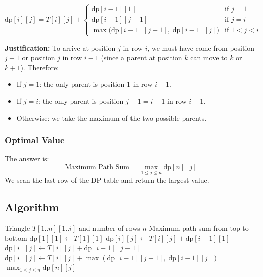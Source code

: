 \documentclass[12pt,a4paper]{article}
\begin{document}
\[
    \text{dp}[i][j] = T[i][j] + \begin{cases}
        \text{dp}[i-1][1] & \text{if } j = 1 \\[6pt]
        \text{dp}[i-1][j-1] & \text{if } j = i \\[6pt]
        \max\!\big(\text{dp}[i-1][j-1],\; \text{dp}[i-1][j]\big) & \text{if } 1 < j < i
    \end{cases}
\]

\textbf{Justification:} To arrive at position $j$ in row $i$, we must have come from position $j-1$ or position $j$ in row $i-1$ (since a parent at position $k$ can move to $k$ or $k+1$). Therefore:
\begin{itemize}[nosep]
    \item If $j = 1$: the only parent is position $1$ in row $i-1$.
    \item If $j = i$: the only parent is position $j-1 = i-1$ in row $i-1$.
    \item Otherwise: we take the maximum of the two possible parents.
\end{itemize}

\subsubsection*{Optimal Value}
The answer is:
\[
    \text{Maximum Path Sum} = \max_{1 \le j \le n} \text{dp}[n][j]
\]
We scan the last row of the DP table and return the largest value.

\subsection*{Algorithm}

\begin{algorithm}[H]
\caption{\textsc{TriangleMaxPathSum}$(T, n)$}
\begin{algorithmic}[1]
\Require Triangle $T[1..n][1..i]$ and number of rows $n$
\Ensure Maximum path sum from top to bottom
\State $\text{dp}[1][1] \gets T[1][1]$
            \State $\text{dp}[i][j] \gets T[i][j] + \text{dp}[i-1][1]$
            \State $\text{dp}[i][j] \gets T[i][j] + \text{dp}[i-1][j-1]$
        \Else
            \State $\text{dp}[i][j] \gets T[i][j] + \max(\text{dp}[i-1][j-1],\; \text{dp}[i-1][j])$
        \EndIf
    \EndFor
\EndFor
\State \Return $\max_{1 \le j \le n} \text{dp}[n][j]$
\end{algorithmic}
\end{algorithm}
\end{document}
